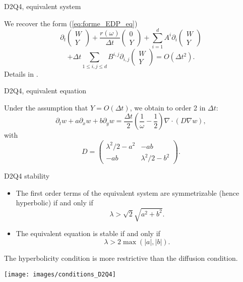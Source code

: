 \documentclass[english]{beamer}
\begin{document}
\begin{frame}{D2Q4, equivalent system}

We recover the form (\ref{eq:forme_EDP_eq}) 
\[
\partial_{t}\left(\begin{array}{c}
W\\
Y
\end{array}\right)+\frac{r(\omega)}{\Delta t}\left(\begin{array}{c}
0\\
Y
\end{array}\right)+\sum_{i=1}^{d}A^{i}\partial_{i}\left(\begin{array}{c}
W\\
Y
\end{array}\right)
\]
\[
+\Delta t\sum_{1\leq i,j\leq d}B^{i,j}\partial_{i,j}\left(\begin{array}{c}
W\\
Y
\end{array}\right)=O(\Delta t^{2}).
\]
Details in \cite{guillon2023stability}.
\end{frame}
%
\begin{frame}{D2Q4, equivalent equation}

Under the assumption that $Y=O(\Delta t)$, we obtain to order 2 in
$\Delta t$:
\[
\partial_{t}w+a\partial_{x}w+b\partial_{y}w=\frac{\Delta t}{2}(\frac{1}{\omega}-\frac{1}{2})\nabla\cdot(D\nabla w),
\]
with
\[
D=\left(\begin{array}{cc}
\lambda^{2}/2-a^{2} & -ab\\
-ab & \lambda^{2}/2-b^{2}
\end{array}\right).
\]

\end{frame}
%
\begin{frame}{D2Q4 stability}
\begin{itemize}
\item The first order terms  of the equivalent system are symmetrizable (hence hyperbolic) if and only if
\[
\lambda>\sqrt{2}\sqrt{a^{2}+b^{2}}.
\]
\item The equivalent equation is stable if and only if
\[
\lambda>2\max(\left|a\right|,\left|b\right|).
\]
\end{itemize}
\begin{minipage}[c]{0.5\textwidth}%
The hyperbolicity condition is more restrictive than the diffusion condition.%
\end{minipage}%
\begin{minipage}[c]{0.5\textwidth}%
\begin{center}
\texttt{[image: images/conditions\_D2Q4]}
\par\end{center}%
\end{minipage}
\end{frame}
\end{document}
